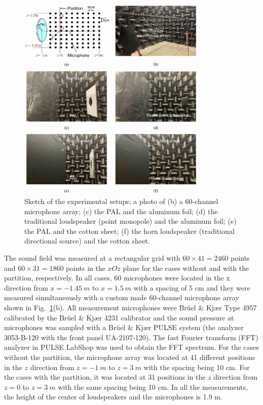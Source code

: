 \begin{figure}[!htb]
    \centering
    \includegraphics[width = 0.8\textwidth]{Figures/pending/Experiment setup all-Resize.jpg}
    \caption{Sketch of the experimental setups; a photo of (b) a 60-channel microphone array; (c) the PAL and the aluminum foil; (d) the traditional loudspeaker (point monopole) and the aluminum foil; (e) the PAL and the cotton sheet; (f) the horn loudspeaker (traditional directional source) and the cotton sheet.}
    \label{fig:partition_exp}
\end{figure}

The sound field was measured at a rectangular grid with $60 \times 41 = 2460$ points and $60 \times 31 = 1860 $ points in the $xOz$ plane for the cases without and with the partition, respectively. 
In all cases, 60 microphones were located in the x direction from $x = \SI{-1.45}{ m}$ to $x = \SI{1.5 }{m}$ with a spacing of 5 cm and they were measured simultaneously with a custom made 60-channel microphone array shown in Fig.~\ref{fig:partition_exp}(b). 
All measurement microphones were Brüel \& Kjær Type 4957 calibrated by the Brüel \& Kjær 4231 calibrator and the sound pressure at microphones was sampled with a Brüel \& Kjær PULSE system (the analyzer 3053-B-120 with the front panel UA-2107-120). 
The fast Fourier transform (FFT) analyzer in PULSE LabShop was used to obtain the FFT spectrum. 
For the cases without the partition, the microphone array was located at 41 different positions in the $z$ direction from $z = \SI{-1 }{m}$ to $z = \SI{3 }{m}$ with the spacing being 10 cm. 
For the cases with the partition, it was located at 31 positions in the $z$ direction from $z = 0$ to $z = \SI{3 }{m}$ with the same spacing being 10 cm. 
In all the measurements, the height of the center of loudspeakers and the microphones is 1.9 m.


